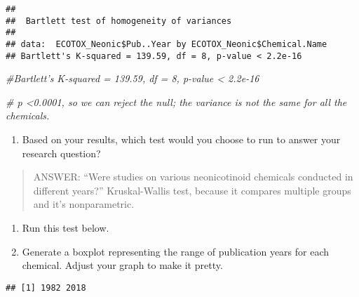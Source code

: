 \documentclass[]{article}
\newenvironment{Shaded}{\begin{snugshade}}{\end{snugshade}}
\newcommand{\KeywordTok}[1]{\textcolor[rgb]{0.13,0.29,0.53}{\textbf{#1}}}
\newcommand{\CommentTok}[1]{\textcolor[rgb]{0.56,0.35,0.01}{\textit{#1}}}
\newcommand{\OperatorTok}[1]{\textcolor[rgb]{0.81,0.36,0.00}{\textbf{#1}}}
\newcommand{\NormalTok}[1]{#1}
\providecommand{\tightlist}{%
  \setlength{\itemsep}{0pt}\setlength{\parskip}{0pt}}
\begin{document}
\begin{verbatim}
## 
##  Bartlett test of homogeneity of variances
## 
## data:  ECOTOX_Neonic$Pub..Year by ECOTOX_Neonic$Chemical.Name
## Bartlett's K-squared = 139.59, df = 8, p-value < 2.2e-16
\end{verbatim}

\begin{Shaded}
\begin{Highlighting}[]
\CommentTok{#Bartlett's K-squared = 139.59, df = 8, p-value < 2.2e-16}

\CommentTok{# p <0.0001, so we can reject the null; the variance is not the same for all the chemicals.}
\end{Highlighting}
\end{Shaded}

\begin{enumerate}
\def\labelenumi{\arabic{enumi}.}
\setcounter{enumi}{5}
\tightlist
\item
  Based on your results, which test would you choose to run to answer
  your research question?
\end{enumerate}

\begin{quote}
ANSWER: ``Were studies on various neonicotinoid chemicals conducted in
different years?'' Kruskal-Wallis test, because it compares multiple
groups and it's nonparametric.
\end{quote}

\begin{enumerate}
\def\labelenumi{\arabic{enumi}.}
\setcounter{enumi}{6}
\item
  Run this test below.
\item
  Generate a boxplot representing the range of publication years for
  each chemical. Adjust your graph to make it pretty.
\end{enumerate}

\begin{Shaded}
\end{Shaded}

\begin{verbatim}
## [1] 1982 2018
\end{verbatim}

\begin{Shaded}
\end{Shaded}
\end{document}
